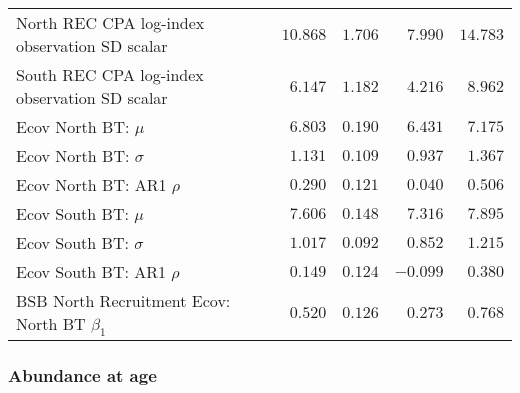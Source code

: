 \documentclass[
]{article}
\begin{document}
\begin{landscape}
\begin{longtable}[t]{lrrrr}
North REC CPA log-index observation SD scalar & $10.868$ & $1.706$ & $7.990$ & $14.783$\\
South REC CPA log-index observation SD scalar & $6.147$ & $1.182$ & $4.216$ & $8.962$\\
Ecov North BT: $\mu$ & $6.803$ & $0.190$ & $6.431$ & $7.175$\\
\addlinespace
Ecov North BT: $\sigma$ & $1.131$ & $0.109$ & $0.937$ & $1.367$\\
Ecov North BT: AR1 $\rho$ & $0.290$ & $0.121$ & $0.040$ & $0.506$\\
Ecov South BT: $\mu$ & $7.606$ & $0.148$ & $7.316$ & $7.895$\\
Ecov South BT: $\sigma$ & $1.017$ & $0.092$ & $0.852$ & $1.215$\\
Ecov South BT: AR1 $\rho$ & $0.149$ & $0.124$ & $-0.099$ & $0.380$\\
\addlinespace
BSB North Recruitment Ecov: North BT $\beta_1$ & $0.520$ & $0.126$ & $0.273$ & $0.768$\\*
\end{longtable}
\end{landscape}

\hypertarget{abundance-at-age}{%
\subsubsection{Abundance at age}\label{abundance-at-age}}
\end{document}
